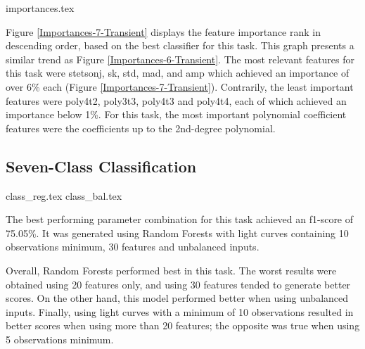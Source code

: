 

{importances.tex}

Figure \ref{Importances-7-Transient} displays the feature importance rank in descending order, based on the best classifier for this task. This graph presents a similar trend as Figure \ref{Importances-6-Transient}. The most relevant features for this task were stetson\textunderscore j, sk, std, mad, and amp which achieved an importance of over 6\% each (Figure \ref{Importances-7-Transient}). Contrarily, the least important features were poly4\textunderscore t2, poly3\textunderscore t3, poly4\textunderscore t3 and poly4\textunderscore t4, each of which achieved an importance below 1\%. For this task, the most important polynomial coefficient features were the coefficients up to the 2nd-degree polynomial. 



\subsection{Seven-Class Classification}

{class_reg.tex}
{class_bal.tex}

The best performing parameter combination for this task achieved an f1-score of 75.05\%. It was generated using Random Forests with light curves containing 10 observations minimum, 30 features and unbalanced inputs. 

Overall, Random Forests performed best in this task. The worst results were obtained using 20 features only, and using 30 features tended to generate better scores. On the other hand, this model performed better when using unbalanced inputs. Finally, using light curves with a minimum of 10 observations resulted in better scores when using more than 20 features; the opposite was true when using 5 observations minimum.

